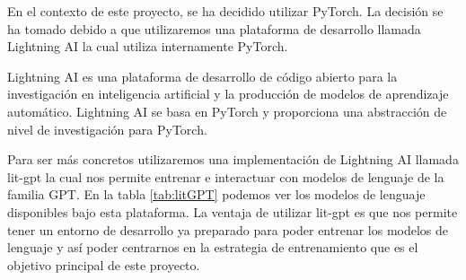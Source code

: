 En el contexto de este proyecto, se ha decidido utilizar PyTorch. La decisión se ha
tomado debido a que utilizaremos una plataforma de desarrollo llamada Lightning AI
la cual utiliza internamente PyTorch.

Lightning AI es una plataforma de desarrollo de código abierto para la investigación
en inteligencia artificial y la producción de modelos de aprendizaje automático.
Lightning AI se basa en PyTorch y proporciona una abstracción de nivel de investigación
para PyTorch. \cite{LightningAI}

Para ser más concretos utilizaremos una implementación de Lightning AI llamada
lit-gpt\cite{litGPT} la cual nos permite entrenar e interactuar con modelos de lenguaje
de la familia GPT. En la tabla \ref{tab:litGPT} podemos ver los modelos de lenguaje
disponibles bajo esta plataforma. La ventaja de utilizar lit-gpt es que nos permite
tener un entorno de desarrollo ya preparado para poder entrenar los modelos de lenguaje
y así poder centrarnos en la estrategia de entrenamiento que es el objetivo principal de
este proyecto.

